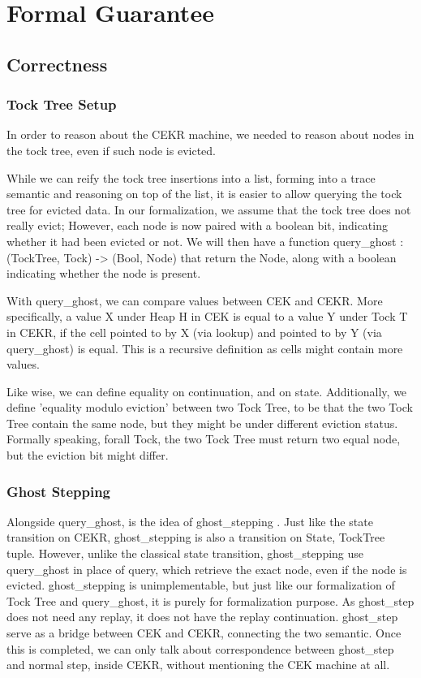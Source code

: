 \section{Formal Guarantee}
\subsection{Correctness}
\subsubsection{Tock Tree Setup}
In order to reason about the CEKR machine, we needed to reason about nodes in the tock tree, even if such node is evicted.

While we can reify the tock tree insertions into a list, forming into a trace semantic and reasoning on top of the list, it is easier to allow querying the tock tree for evicted data. In our formalization, we assume that the tock tree does not really evict; However, each node is now paired with a boolean bit, indicating whether it had been evicted or not. We will then have a function query\_ghost : (TockTree, Tock) -> (Bool, Node) that return the Node, along with a boolean indicating whether the node is present.

With query\_ghost, we can compare values between CEK and CEKR. More specifically, a value X under Heap H in CEK is equal to a value Y under Tock T in CEKR, if the cell pointed to by X (via lookup) and pointed to by Y (via query\_ghost) is equal. This is a recursive definition as cells might contain more values.

Like wise, we can define equality on continuation, and on state. Additionally, we define 'equality modulo eviction' between two Tock Tree, to be that the two Tock Tree contain the same node, but they might be under different eviction status. Formally speaking, forall Tock, the two Tock Tree must return two equal node, but the eviction bit might differ.

\subsubsection{Ghost Stepping}

Alongside query\_ghost, is the idea of ghost\_stepping . Just like the state transition on CEKR, ghost\_stepping is also a transition on State, TockTree tuple. However, unlike the classical state transition, ghost\_stepping use query\_ghost in place of query, which retrieve the exact node, even if the node is evicted. ghost\_stepping is unimplementable, but just like our formalization of Tock Tree and query\_ghost, it is purely for formalization purpose. As ghost\_step does not need any replay, it does not have the replay continuation. ghost\_step serve as a bridge between CEK and CEKR, connecting the two semantic. Once this is completed, we can only talk about correspondence between ghost\_step and normal step, inside CEKR, without mentioning the CEK machine at all.

